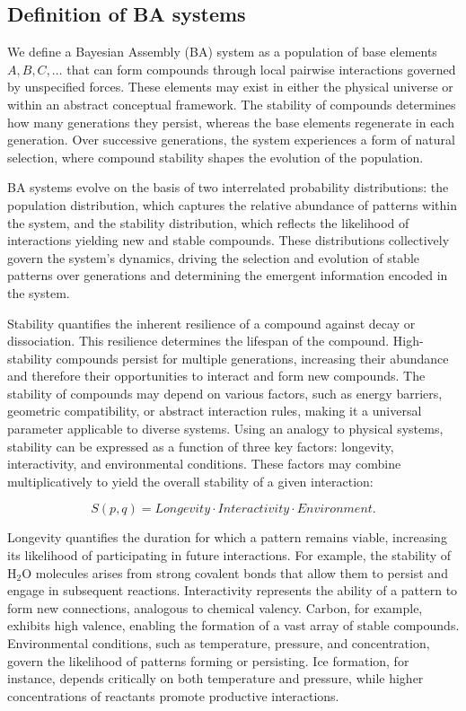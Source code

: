 \documentclass[entropy,article,submit,pdftex,oneauthor]{Definitions/mdpi}
\begin{document}
\subsection{Definition of BA systems}

We define a Bayesian Assembly (BA) system as a population of base elements \( A, B, C, \dots \) that can form compounds through local pairwise interactions governed by unspecified forces. These elements may exist in either the physical universe or within an abstract conceptual framework. The stability of compounds determines how many generations they persist, whereas the base elements regenerate in each generation. Over successive generations, the system experiences a form of natural selection, where compound stability shapes the evolution of the population.

BA systems evolve on the basis of two interrelated probability distributions: the population distribution, which captures the relative abundance of patterns within the system, and the stability distribution, which reflects the likelihood of interactions yielding new and stable compounds. These distributions collectively govern the system's dynamics, driving the selection and evolution of stable patterns over generations and determining the emergent information encoded in the system.

Stability quantifies the inherent resilience of a compound against decay or dissociation. This resilience determines the lifespan of the compound. High-stability compounds persist for multiple generations, increasing their abundance and therefore their opportunities to interact and form new compounds. The stability of compounds may depend on various factors, such as energy barriers, geometric compatibility, or abstract interaction rules, making it a universal parameter applicable to diverse systems. Using an analogy to physical systems, stability can be expressed as a function of three key factors: longevity, interactivity, and environmental conditions. These factors may combine multiplicatively to yield the overall stability of a given interaction:

\[
S(p, q) = Longevity \cdot Interactivity \cdot Environment.
\]

Longevity quantifies the duration for which a pattern remains viable, increasing its likelihood of participating in future interactions. For example, the stability of \( \text{H}_2\text{O} \) molecules arises from strong covalent bonds that allow them to persist and engage in subsequent reactions. Interactivity represents the ability of a pattern to form new connections, analogous to chemical valency. Carbon, for example, exhibits high valence, enabling the formation of a vast array of stable compounds. Environmental conditions, such as temperature, pressure, and concentration, govern the likelihood of patterns forming or persisting. Ice formation, for instance, depends critically on both temperature and pressure, while higher concentrations of reactants promote productive interactions.
\end{document}
